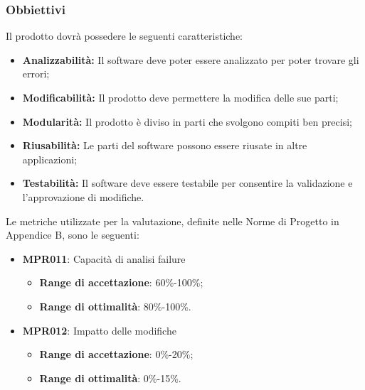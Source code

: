 \subsubsection{Obbiettivi } Il prodotto dovrà possedere le seguenti caratteristiche:
\begin{itemize}
	\item \textbf{Analizzabilità:} Il software deve poter essere analizzato per poter trovare gli errori;
	\item \textbf{Modificabilità:} Il prodotto deve permettere la modifica delle sue parti;
	\item \textbf{Modularità:} Il prodotto è diviso in parti che svolgono compiti ben precisi;
	\item \textbf{Riusabilità:} Le parti del software possono essere riusate in altre applicazioni;
	\item \textbf{Testabilità:} Il software deve essere testabile per consentire la validazione e l'approvazione di modifiche.
\end{itemize}	Le metriche utilizzate per la valutazione, definite nelle Norme di Progetto in Appendice B, sono le seguenti:
\begin{itemize}
	\item \textbf{MPR011}: Capacità di analisi failure
	\begin{itemize}
		\item \textbf{Range di accettazione}: 60\%-100\%;
		\item \textbf{Range di ottimalità}: 80\%-100\%.
	\end{itemize}
	\item \textbf{MPR012}: Impatto delle modifiche
	\begin{itemize}
		\item \textbf{Range di accettazione}: 0\%-20\%;
		\item \textbf{Range di ottimalità}: 0\%-15\%.
	\end{itemize}
\end{itemize}

